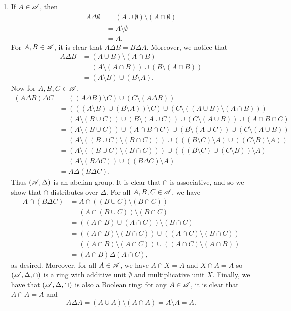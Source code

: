 \begin{prob}
\begin{enumerate}
\item If $A \in \mathscr{A}$, then
\begin{align*}
A\Delta\emptyset & = (A\cup\emptyset)\setminus(A\cap\emptyset)\\
& = A\setminus\emptyset\\
& = A.
\end{align*}
For $A, B \in \mathscr{A}$, it is clear that $A\Delta B = B\Delta A$. Moreover, we notice that
\begin{align*}
A\Delta B & = (A\cup B)\setminus(A\cap B)\\
& = (A\setminus(A\cap B))\cup(B\setminus(A\cap B))\\
& = (A\setminus B)\cup(B\setminus A).
\end{align*}
Now for $A, B, C \in \mathscr{A}$,
\begin{align*}
(A\Delta B)\Delta C & = ((A\Delta B)\setminus C)\cup (C\setminus(A\Delta B))\\
& = (((A\setminus B)\cup(B\setminus A))\setminus C)\cup(C\setminus((A\cup B)\setminus(A\cap B)))\\
& = (A\setminus(B\cup C))\cup(B\setminus(A\cup C))\cup(C\setminus(A\cup B))\cup(A\cap B\cap C)\\
& = (A\setminus(B\cup C))\cup(A\cap B\cap C)\cup(B\setminus(A\cup C))\cup(C\setminus(A\cup B))\\
& = (A\setminus((B\cup C)\setminus(B\cap C)))\cup(((B\setminus C)\setminus A)\cup((C\setminus B)\setminus A))\\
& = (A\setminus((B\cup C)\setminus(B\cap C)))\cup(((B\setminus C)\cup(C\setminus B))\setminus A)\\
& = (A\setminus(B\Delta C))\cup((B\Delta C)\setminus A)\\
& = A\Delta(B\Delta C).
\end{align*}
Thus $(\mathscr{A}, \Delta)$ is an abelian group. It is clear that $\cap$ is associative, and so we show that $\cap$ distributes over $\Delta$. For all $A, B, C \in \mathscr{A}$, we have
\begin{align*}
A\cap(B\Delta C) & = A\cap((B\cup C)\setminus(B\cap C))\\
& = (A\cap(B\cup C))\setminus(B\cap C)\\
& = ((A\cap B)\cup(A\cap C))\setminus(B\cap C)\\
& = ((A\cap B)\setminus(B\cap C))\cup((A\cap C)\setminus(B\cap C))\\
&  = ((A\cap B)\setminus(A\cap C))\cup((A\cap C)\setminus(A\cap B))\\
& = (A\cap B)\Delta(A\cap C),
\end{align*}
as desired. Moreover, for all $A \in \mathscr{A}$, we have $A\cap X = A$ and $X\cap A = A$ so $(\mathscr{A}, \Delta, \cap)$ is a ring with additive unit $\emptyset$ and multiplicative unit $X$. Finally, we have that $(\mathscr{A}, \Delta, \cap)$ is also a Boolean ring: for any $A \in \mathscr{A}$, it is clear that $A\cap A = A$ and \[A\Delta A = (A\cup A)\setminus(A\cap A) = A\setminus A = A.\]


\end{enumerate}
\end{prob}
